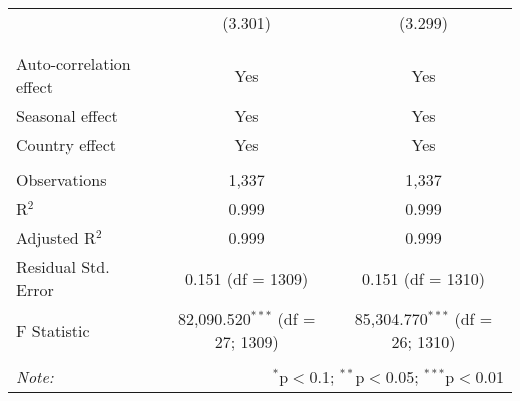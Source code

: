 \begin{table}[!htbp]
\begin{tabular}{@{\extracolsep{5pt}}lcc}
  & (3.301) & (3.299) \\ 
  & & \\ 
\hline \\[-1.8ex] 
Auto-correlation effect & Yes & Yes \\ 
Seasonal effect & Yes & Yes \\ 
Country effect & Yes & Yes \\ 
\hline \\[-1.8ex] 
Observations & 1,337 & 1,337 \\ 
R$^{2}$ & 0.999 & 0.999 \\ 
Adjusted R$^{2}$ & 0.999 & 0.999 \\ 
Residual Std. Error & 0.151 (df = 1309) & 0.151 (df = 1310) \\ 
F Statistic & 82,090.520$^{***}$ (df = 27; 1309) & 85,304.770$^{***}$ (df = 26; 1310) \\ 
\hline 
\hline \\[-1.8ex] 
\textit{Note:}  & \multicolumn{2}{r}{$^{*}$p$<$0.1; $^{**}$p$<$0.05; $^{***}$p$<$0.01} \\ 
\end{tabular} 
\end{table} 

